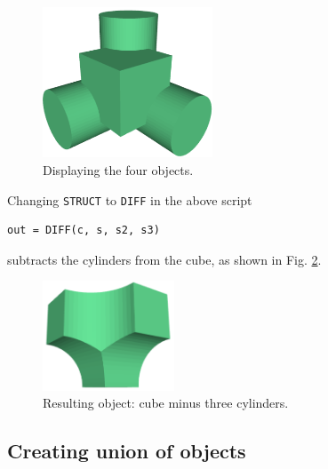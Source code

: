 \begin{figure}[!ht]
\begin{center}
\includegraphics[width=0.45\textwidth]{img/diff-3.png}
\end{center}
\vspace{-4mm}
\caption{Displaying the four objects.}
\label{fig:diff-3}
\vspace{-1cm}
\end{figure}
\noindent
\newpage
\noindent
Changing {\tt STRUCT} to {\tt DIFF} in the above script\\

\begin{bbox}
\begin{verbatim}
out = DIFF(c, s, s2, s3) 
\end{verbatim}
\end{bbox}
\vspace{6mm}

\noindent
subtracts the cylinders from the cube, as shown in Fig. \ref{fig:diff-4}.

\begin{figure}[!ht]
\begin{center}
\includegraphics[width=0.35\textwidth]{img/diff-4b.png}
\end{center}
\vspace{-4mm}
\caption{Resulting object: cube minus three cylinders.}
\label{fig:diff-4}
\end{figure}

\subsection{Creating union of objects}\label{subsec:union}

